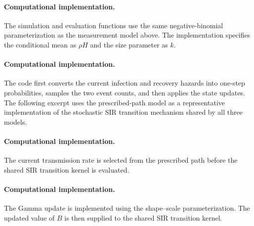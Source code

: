 
\paragraph{Computational implementation.}
The simulation and evaluation functions use the same negative-binomial
parameterization as the measurement model above. The implementation specifies
the conditional mean as \(\rho H\) and the size parameter as \(k\).



\paragraph{Computational implementation.}
The code first converts the current infection and recovery hazards into
one-step probabilities, samples the two event counts, and then applies the
state updates. The following excerpt uses the prescribed-path model as a
representative implementation of the stochastic SIR transition mechanism
shared by all three models.



\paragraph{Computational implementation.}
The current transmission rate is selected from the prescribed path before the
shared SIR transition kernel is evaluated.



\paragraph{Computational implementation.}
The Gamma update is implemented using the shape--scale parameterization. The
updated value of \(B\) is then supplied to the shared SIR transition kernel.

